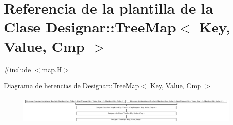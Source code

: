\hypertarget{class_designar_1_1_tree_map}{}\section{Referencia de la plantilla de la Clase Designar\+:\+:Tree\+Map$<$ Key, Value, Cmp $>$}
\label{class_designar_1_1_tree_map}


{\ttfamily \#include $<$map.\+H$>$}

Diagrama de herencias de Designar\+:\+:Tree\+Map$<$ Key, Value, Cmp $>$\begin{figure}[H]
\begin{center}
\leavevmode
\includegraphics[height=1.460235cm]{class_designar_1_1_tree_map}
\end{center}
\end{figure}
